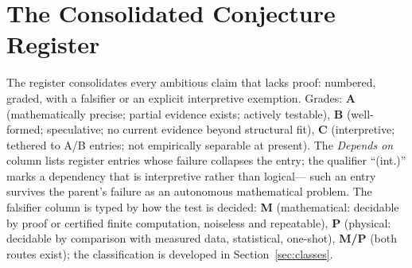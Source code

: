
\section{The Consolidated Conjecture Register}\label{sec:register}

The register consolidates every ambitious claim that lacks proof: numbered, graded, with a
falsifier or an explicit interpretive exemption. Grades: \textbf{A} (mathematically
precise; partial evidence exists; actively
testable), \textbf{B} (well-formed; speculative; no current evidence beyond structural
fit), \textbf{C} (interpretive; tethered to A/B entries; not empirically separable at
present). The \emph{Depends on} column lists register entries whose failure collapses the
entry; the qualifier ``(int.)'' marks a dependency that is interpretive rather than logical---
such an entry survives the parent's failure as an autonomous mathematical problem. The
falsifier column is typed by how the test is decided: \textbf{M} (mathematical: decidable
by proof or certified finite computation, noiseless and repeatable), \textbf{P} (physical:
decidable by comparison with measured data, statistical, one-shot), \textbf{M/P} (both
routes exist); the classification is developed in Section~\ref{sec:classes}.

